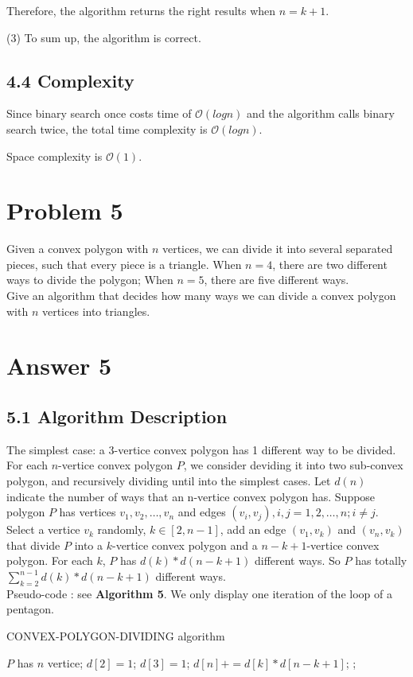 \documentclass[UTF8]{ctexart}
\begin{document}
Therefore, the algorithm returns the right results when $n = k + 1$.

(3) To sum up, the algorithm is correct.
\subsection*{4.4 Complexity} 
Since binary search once costs time of $\mathcal{O}(logn)$ and the algorithm calls binary search twice, the total time complexity is $\mathcal{O}(logn)$.

Space complexity is $\mathcal{O}(1)$.

\section*{Problem 5}
Given a convex polygon with $n$ vertices, we can divide it into several separated pieces, such
that every piece is a triangle. When $n = 4$, there are two different ways to divide the polygon;
When $n = 5$, there are five different ways.\\
Give an algorithm that decides how many ways we can divide a convex polygon with $n$ vertices into triangles.

\section*{Answer 5}
\subsection*{5.1 Algorithm Description}
The simplest case: a 3-vertice convex polygon has 1 different way to be divided. For each $n$-vertice convex polygon $P$, we consider deviding it into two sub-convex polygon, and recursively dividing until into the simplest cases.
Let $d(n)$ indicate the number of ways that an n-vertice convex polygon has. 
Suppose polygon $P$ has vertices $v_1, v_2, \ldots, v_n$ and edges $(v_i, v_j), i,j = 1, 2, \ldots, n; i \neq j$. Select a vertice $v_k$ randomly, $k\in [2, n-1]$, add an edge $(v_1, v_k)$ and $(v_n, v_k)$ that
divide $P$ into a $k$-vertice convex polygon and a $n-k+1$-vertice convex polygon. For each $k$, $P$ has $d(k) * d(n-k+1)$ different ways. So $P$ has totally
$\sum_{k=2}^{n-1} d(k) * d(n-k+1)$ different ways.\\

Pseudo-code : see \textbf{Algorithm 5}. We only display one iteration of the loop of a pentagon.

\begin{algorithm}[htbp]
	\caption{CONVEX-POLYGON-DIVIDING algorithm}
	\begin{algorithmic}[1]
		\State $P$ has $n$ vertice;
		\State $d[2] = 1$; $d[3] = 1$;
			\State $d[n] += d[k] * d[n-k+1]$;
		\EndFor
		\State {};
	\EndFunction
	\end{algorithmic}
\end{algorithm}
\end{document}
